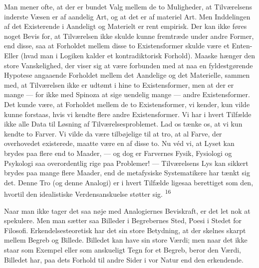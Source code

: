 \documentclass[12pt,a4paper,openany]{book}
\begin{document}
Man mener ofte, at der er bundet Valg mellem de to Muligheder, at
Tilværelsens inderste Væsen er af aandelig Art, og at det er af materiel
Art. Men Inddelingen af det Existerende i Aandeligt og Materielt er rent
empirisk. Der kan ikke føres noget Bevis for, at Tilværelsen ikke skulde
kunne fremtræde under andre Former, end disse, saa at Forholdet mellem
disse to Existensformer skulde være et Enten-Eller (hvad man i Logiken
kalder et kontradiktorisk Forhold). Maaske hænger den store
Vanskelighed, der viser sig at være forbunden med at naa en
fyldestgørende Hypotese angaaende Forholdet mellem det Aandelige og det
Materielle, sammen med, at Tilværelsen ikke er udtømt i hine to
Existensformer, men at der er mange --- for ikke med Spinoza at sige
uendelig mange --- andre Existensformer. Det kunde være, at Forholdet
mellem de to Existensformer, vi kender, kun vilde kunne forstaas, hvis
vi kendte flere andre Existensformer. Vi har i hvert Tilfælde ikke alle
Data til Løsning af Tilværelsesproblemet. Lad os tænke os, at vi kun
kendte to Farver. Vi vilde da være tilbøjelige til at tro, at al Farve,
der overhovedet existerede, maatte være en af disse to. Nu véd vi, at
Lyset kan brydes paa flere end to Maader, --- og dog er Farvernes Fysik,
Fysiologi og Psykologi saa overordentlig rige paa Problemer! ---
Tilværelsens Lys kan sikkert brydes paa mange flere Maader, end de
metafysiske Systematikere har tænkt sig det. Denne Tro (og denne
Analogi) er i hvert Tilfælde ligesaa berettiget som den, hvortil den
idealistiske Verdensanskuelse støtter sig. \textsuperscript{16}

Naar man ikke tager det saa nøje med Analogiernes Beviskraft, er det let
nok at spekulere. Men man sætter saa Billeder i Begrebernes Sted, Poesi
i Stedet for Filosofi. Erkendelsesteoretisk har det sin store Betydning,
at der skelnes skarpt mellem Begreb og Billede. Billedet kan have sin
store Værdi; men naar det ikke staar som Exempel eller som anskueligt
Tegn for et Begreb, beror den Værdi, Billedet har, paa dets Forhold til
andre Sider i vor Natur end den erkendende.
\end{document}
